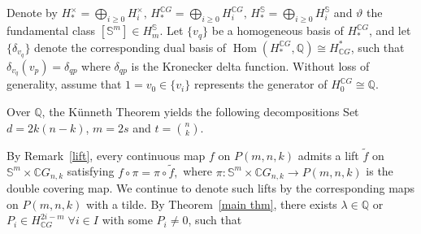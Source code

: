 \documentclass{amsart}
\newtheorem{proposition}[theorem]{Proposition}
\begin{document}

	
	
	
	
	\subsection{} Denote by $H_*^\times = \bigoplus_{i\geq 0} H_i^{\times},\, H_*^{\mathbb{C}G} = \bigoplus_{i\geq 0} H_i^{\mathbb{C}G},\, H_*^{\mathbb{S}} = \bigoplus_{i\geq 0} H_i^{\mathbb{S}}$ and $\vartheta$ the fundamental class $[\mathbb S^m]\in H_m^{\mathbb S}$. Let $\{v_q\}$ be a homogeneous basis of $H_*^{\mathbb{C}G}$, and let $\{\delta_{v_q}\}$ denote the corresponding dual basis of  
	$\operatorname{Hom}(H_*^{\mathbb{C}G}, \mathbb Q) \cong H^*_{\mathbb{C}G}$, such that  
	$ \delta_{v_q} (v_p) = \delta_{qp}$ where $\delta_{qp}$ is the Kronecker delta function. Without loss of generality, assume that $1=v_0 \in \{v_i\}$ represents the generator of $H_0^{\mathbb{C}G} \cong \mathbb Q$.
	
	Over $\mathbb Q$, the K\"unneth Theorem yields the following decompositions 
	\iffalse	Set $d = 2k(n - k)$, $m=2s$ and $t={n \choose k}$. 
	
	By Remark~\ref{lift}, every continuous map $f$ on $P(m,n,k)$ admits a lift 
	$\tilde f$ on $\mathbb{S}^m \times \mathbb{C}G_{n,k}$ satisfying 
	$f \circ \pi = \pi \circ \tilde f,$
	where $\pi : \mathbb{S}^m \times \mathbb{C}G_{n,k} \to P(m,n,k)$ is the double covering map. 
	We continue to denote such lifts by the corresponding maps on $P(m,n,k)$ with a tilde.
	By Theorem~\ref{main thm}, there exists  $\lambda \in \mathbb{Q}$ or $P_i\in H^{2i-m}_{\mathbb CG} \;\forall i\in I$ with some $P_i\neq 0$, such that \
	
\end{document}
